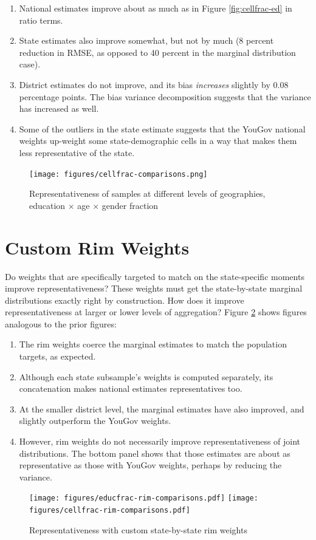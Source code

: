\documentclass[11pt]{article}
\begin{document}
\smallskip 
\begin{enumerate}
\item National estimates improve about as much as in Figure \ref{fig:cellfrac-ed} in ratio terms.
\item State estimates also improve somewhat, but not by much (8 percent reduction in RMSE, as opposed to 40 percent in the marginal distribution case).
\item District estimates do not improve, and its bias \emph{increases} slightly by 0.08 percentage points. The bias variance decomposition suggests that the variance has increased as well.
\item Some of the outliers in the state estimate suggests that the YouGov national weights up-weight some state-demographic cells in a way that makes them less representative of the state. 
\end{enumerate}

\begin{figure}[bt!h]
\centering
\caption{Representativeness of samples at different levels of geographies, education \(\times\) age \(\times\) gender fraction \label{fig:cellfrac-ed-age-sex}}
\texttt{[image: figures/cellfrac-comparisons.png]}
\end{figure}

\FloatBarrier
\newpage

\section*{Custom Rim Weights}

Do weights that are specifically targeted to match on the state-specific moments improve representativeness? These weights must get the state-by-state marginal distributions exactly right by construction. How does it improve representativeness at larger or lower levels of aggregation? Figure \ref{fig:rim-comparisons} shows figures analogous to the prior figures:

\medskip
\begin{enumerate}
\item The rim weights coerce the marginal estimates to match the population targets, as expected.
\item Although each state subsample's weights is computed separately, its concatenation makes national estimates representatives too. 
\item At the smaller district level, the marginal estimates have also improved, and slightly outperform the YouGov weights.
\item However, rim weights do not necessarily improve representativeness of joint distributions. The bottom panel shows that those estimates are about as representative as those with YouGov weights, perhaps by reducing the variance.
\end{enumerate}

\FloatBarrier

\begin{figure}[!ht]
\centering
\caption{Representativeness with custom state-by-state rim weights \label{fig:rim-comparisons}}
\texttt{[image: figures/educfrac-rim-comparisons.pdf]}
\texttt{[image: figures/cellfrac-rim-comparisons.pdf]}
\end{figure}
\end{document}

